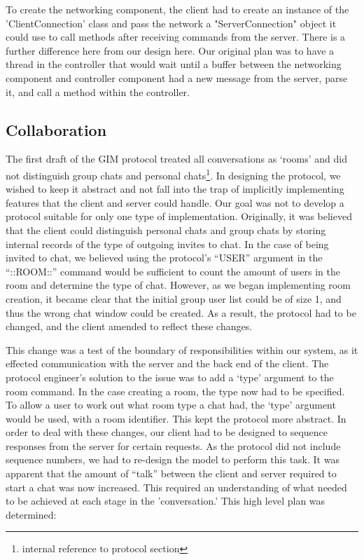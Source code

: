  To create the networking component, the client had to create an instance of the 'ClientConnection' class and pass the network a "ServerConnection" object it could use to call methods after receiving commands from the server. There is a further difference here from our design here. Our original plan was  to have a thread in the controller that would wait until a buffer between the networking component and controller component had a new message from the server, parse it, and call a method within the controller. 


\subsection{Collaboration}

The first draft of the GIM protocol treated all conversations as `rooms' and did not distinguish group chats and personal chats\footnote{internal reference to protocol section}. In designing the protocol, we wished to keep it abstract and not fall into the trap of implicitly implementing features that the client and server could handle. Our goal was not to develop a protocol suitable for only one type of implementation. Originally, it was believed that the client could distinguish personal chats and group chats by storing internal records of the type of outgoing invites to chat. In the case of being invited to chat, we believed using the protocol's ``USER'' argument in the ``::ROOM::'' command would be sufficient to count the amount of users in the room and determine the type of chat. However, as we began implementing room creation, it became clear that the initial group user list could be of size 1, and thus the wrong chat window could be created. As a result, the protocol had to be changed, and the client amended to reflect these changes. 

This change was a test of the boundary of responsibilities within our system, as it effected communication with the server and the back end of the client. The protocol engineer's solution to the issue was to add a `type' argument to the room command. In the case creating a room, the type now had to be specified. To allow a user to work out what room type a chat had, the `type' argument would be used, with a room identifier. This kept the protocol more abstract. In order to deal with these changes, our client had to be designed to sequence responses from the server for certain requests. As the protocol did not include sequence numbers, we had to re-design the model to perform this task. It was apparent that the amount of ``talk'' between the client and server required to start a chat was now increased. This required an understanding of what needed to be achieved at each stage in the 'conversation.' This high level plan was determined:

